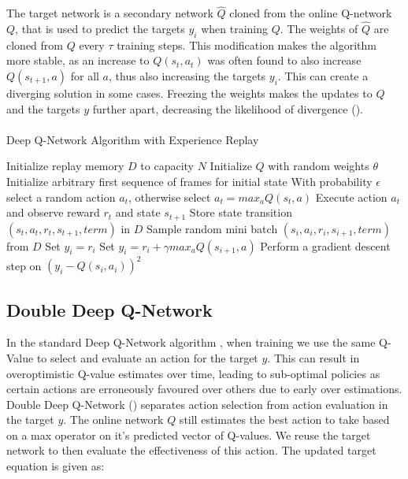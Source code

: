 The target network is a secondary network $\hat{Q}$ cloned from the online Q-network $Q$, that is used to predict the targets $y_i$ when training $Q$. The weights of $\hat{Q}$ are cloned from $Q$ every $\tau$ training steps. This modification makes the algorithm more stable, as an increase to $Q(s_t, a_t)$ was often found to also increase $Q(s_{t+1}, a)$ for all $a$, thus also increasing the targets $y_i$. This can create a diverging solution in some cases. Freezing the weights makes the updates to $Q$ and the targets $y$ further apart, decreasing the likelihood of divergence (\cite{human}). \paragraph{}

\begin{algorithm}
    \caption{Deep Q-Network Algorithm with Experience Replay}\label{alg:DQN}
    \begin{algorithmic}[1]
        \State Initialize replay memory $D$ to capacity $N$
        \State Initialize $Q$ with random weights $\theta$
        \State Initialize arbitrary first sequence of frames for initial state
        \State With probability $\epsilon$ select a random action $a_t$, otherwise select $a_t = max_a Q(s_t, a)$
        \State Execute action $a_t$ and observe reward $r_t$ and state $s_{t+1}$
        \State Store state transition $(s_t, a_t, r_t, s_{t+1}, term)$ in $D$
        \State Sample random mini batch $(s_i, a_i, r_i, s_{i + 1}, term)$ from $D$
        \State Set $y_i = r_i$
        \Else
        \State Set $y_i = r_i + \gamma max_a Q(s_{i+1}, a)$ \label{DQN:target}
        \EndIf
        \EndFor
        \State Perform a gradient descent step on $(y_i - Q(s_i, a_i))^2$
        \EndFor
    \end{algorithmic}
\end{algorithm}

\subsection{Double Deep Q-Network}
In the standard Deep Q-Network algorithm , when training we use the same Q-Value to select and evaluate an action for the target $y$. This can result in overoptimistic Q-value estimates over time, leading to sub-optimal policies as certain actions are erroneously favoured over others due to early over estimations. Double Deep Q-Network (\cite{doubleq}) separates action selection from action evaluation in the target $y$. The online network $Q$ still estimates the best action to take based on a max operator on it's predicted vector of Q-values. We reuse the target network to then evaluate the effectiveness of this action. The updated target equation is given as:

